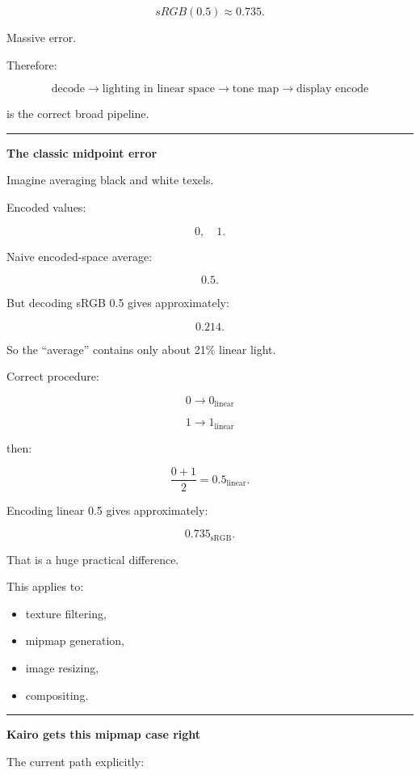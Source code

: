 \[
sRGB(0.5)\approx0.735.
\]

Massive error.

Therefore:

\[
\boxed{
\text{decode}
\rightarrow
\text{lighting in linear space}
\rightarrow
\text{tone map}
\rightarrow
\text{display encode}
}
\]

is the correct broad pipeline.

\begin{center}\rule{0.5\linewidth}{0.5pt}\end{center}

\textbf{The classic midpoint error}

Imagine averaging black and white texels.

Encoded values:

\[
0,\quad1.
\]

Naive encoded-space average:

\[
0.5.
\]

But decoding sRGB 0.5 gives approximately:

\[
0.214.
\]

So the ``average'' contains only about 21\% linear light.

Correct procedure:

\[
0\rightarrow0_{\text{linear}}
\]

\[
1\rightarrow1_{\text{linear}}
\]

then:

\[
\frac{0+1}{2}=0.5_{\text{linear}}.
\]

Encoding linear 0.5 gives approximately:

\[
\boxed{0.735_{\text{sRGB}}}.
\]

That is a huge practical difference.

This applies to:

\begin{itemize}
\tightlist
\item
  texture filtering,
\item
  mipmap generation,
\item
  image resizing,
\item
  compositing.
\end{itemize}

\begin{center}\rule{0.5\linewidth}{0.5pt}\end{center}

\textbf{Kairo gets this mipmap case right}

The current  path explicitly:


